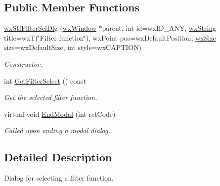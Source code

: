 \subsection*{Public Member Functions}
\begin{DoxyCompactItemize}
\item 
\hyperlink{classwxStfFilterSelDlg_a114732c015ccee7e748d3fe9b8e17af3}{wxStfFilterSelDlg} (\hyperlink{classwxWindow}{wxWindow} $\ast$parent, int id=wxID\_\-ANY, \hyperlink{classwxString}{wxString} title=wxT(\char`\"{}Filter function\char`\"{}), wxPoint pos=wxDefaultPosition, \hyperlink{classwxSize}{wxSize} size=wxDefaultSize, int style=wxCAPTION)
\begin{DoxyCompactList}\small\item\em Constructor. \item\end{DoxyCompactList}\item 
int \hyperlink{classwxStfFilterSelDlg_a8ade8a5950d35b39147c43f7058fbc47}{GetFilterSelect} () const 
\begin{DoxyCompactList}\small\item\em Get the selected filter function. \item\end{DoxyCompactList}\item 
virtual void \hyperlink{classwxStfFilterSelDlg_afd36691d17f9e1c9142625823c6eb653}{EndModal} (int retCode)
\begin{DoxyCompactList}\small\item\em Called upon ending a modal dialog. \item\end{DoxyCompactList}\end{DoxyCompactItemize}


\subsection{Detailed Description}
Dialog for selecting a filter function. 

